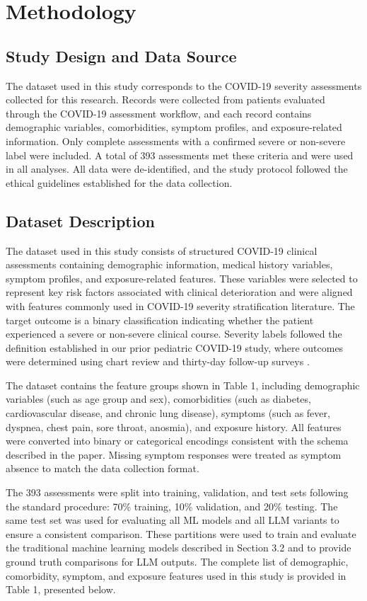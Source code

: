 \section{Methodology}

\subsection{Study Design and Data Source}
The dataset used in this study corresponds to the COVID-19 severity assessments collected for this research. Records were collected from patients evaluated through the COVID-19 assessment workflow, and each record contains demographic variables, comorbidities, symptom profiles, and exposure-related information. Only complete assessments with a confirmed severe or non-severe label were included. A total of 393 assessments met these criteria and were used in all analyses. All data were de-identified, and the study protocol followed the ethical guidelines established for the data collection.

\subsection{Dataset Description}
The dataset used in this study consists of structured COVID-19 clinical assessments containing demographic information, medical history variables, symptom profiles, and exposure-related features. These variables were selected to represent key risk factors associated with clinical deterioration and were aligned with features commonly used in COVID-19 severity stratification literature. The target outcome is a binary classification indicating whether the patient experienced a severe or non-severe clinical course. Severity labels followed the definition established in our prior pediatric COVID-19 study, where outcomes were determined using chart review and thirty-day follow-up surveys \cite{hicks2023saliva}.

The dataset contains the feature groups shown in Table 1, including demographic variables (such as age group and sex), comorbidities (such as diabetes, cardiovascular disease, and chronic lung disease), symptoms (such as fever, dyspnea, chest pain, sore throat, anosmia), and exposure history. All features were converted into binary or categorical encodings consistent with the schema described in the paper. Missing symptom responses were treated as symptom absence to match the data collection format.

The 393 assessments were split into training, validation, and test sets following the standard procedure: 70\% training, 10\% validation, and 20\% testing. The same test set was used for evaluating all ML models and all LLM variants to ensure a consistent comparison. These partitions were used to train and evaluate the traditional machine learning models described in Section 3.2 and to provide ground truth comparisons for LLM outputs. The complete list of demographic, comorbidity, symptom, and exposure features used in this study is provided in Table 1, presented below.

